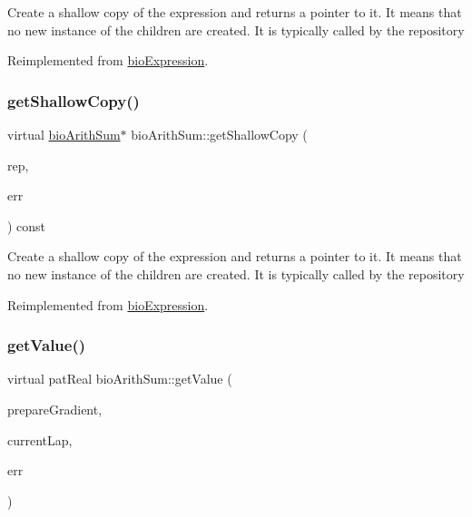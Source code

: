 Create a shallow copy of the expression and returns a pointer to it. It means that no new instance of the children are created. It is typically called by the repository 

Reimplemented from \hyperlink{classbio_expression_a442534762693b92baaf33928979a1bf8}{bio\+Expression}.

\mbox{\label{classbio_arith_sum_a0828ed33f49201118b143dfa336d9212}} 
\subsubsection{\texorpdfstring{get\+Shallow\+Copy()}{getShallowCopy()}\hspace{0.1cm}{\footnotesize\ttfamily [4/4]}}
{\footnotesize\ttfamily virtual \hyperlink{classbio_arith_sum}{bio\+Arith\+Sum}$\ast$ bio\+Arith\+Sum\+::get\+Shallow\+Copy (\begin{DoxyParamCaption}\item[{\hyperlink{classbio_expression_repository}{bio\+Expression\+Repository} $\ast$}]{rep,  }\item[{pat\+Error $\ast$\&}]{err }\end{DoxyParamCaption}) const\hspace{0.3cm}{\ttfamily [virtual]}}

Create a shallow copy of the expression and returns a pointer to it. It means that no new instance of the children are created. It is typically called by the repository 

Reimplemented from \hyperlink{classbio_expression_a442534762693b92baaf33928979a1bf8}{bio\+Expression}.

\mbox{\label{classbio_arith_sum_a3705cb2f1aebf4541131df5638a33379}} 
\subsubsection{\texorpdfstring{get\+Value()}{getValue()}\hspace{0.1cm}{\footnotesize\ttfamily [1/4]}}
{\footnotesize\ttfamily virtual pat\+Real bio\+Arith\+Sum\+::get\+Value (\begin{DoxyParamCaption}\item[{pat\+Boolean}]{prepare\+Gradient,  }\item[{pat\+U\+Long}]{current\+Lap,  }\item[{pat\+Error $\ast$\&}]{err }\end{DoxyParamCaption})\hspace{0.3cm}{\ttfamily [virtual]}}

